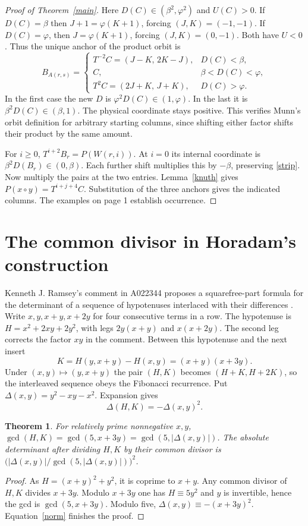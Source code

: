 \documentclass[11pt]{article}
\newtheorem{theorem}{Theorem}
\newcommand{\ph}{\varphi}
\begin{document}
\newpage
\begin{proof}[Proof of Theorem~\ref{main}]
Here $D(C)\in(\beta^2,\ph^2)$ and $U(C)>0$. If $D(C)=\beta$ then
$J+1=\ph(K+1)$, forcing $(J,K)=(-1,-1)$. If $D(C)=\ph$, then
$J=\ph(K+1)$, forcing $(J,K)=(0,-1)$. Both have $U<0$.
Thus the unique anchor of the product orbit is
\[
 B_{A(r,s)}=
 \begin{cases}
 T^{-2} C=(J-K,\,2K-J),&D(C)<\beta,\\
 C,&\beta<D(C)<\ph,\\
 T^2 C=(2J+K,\,J+K),&D(C)>\ph.
 \end{cases}
\]
In the first case the new $D$ is $\ph^2D(C)\in(1,\ph)$. In the last it is
$\beta^2D(C)\in(\beta,1)$. The physical coordinate stays positive.
This verifies Munn's orbit definition for arbitrary starting columns, since shifting
either factor shifts their product by the same amount.

For $i\ge0$, $T^{i+2}B_r=P(W(r,i))$. At $i=0$ its internal coordinate is
$\beta^2D(B_r)\in(0,\beta)$. Each further shift multiplies this by
$-\beta$, preserving \eqref{strip}.
Now multiply the pairs at the two entries. Lemma~\ref{knuth} gives
$P(x\circ y)=T^{i+j+4}C$. Substitution of the three anchors gives the indicated
columns. The examples on page 1 establish occurrence.
\end{proof}

\section{The common divisor in Horadam's construction}
Kenneth J. Ramsey's comment in A022344 proposes a squarefree-part formula for
the determinant of a sequence of hypotenuses interlaced with their differences
\cite{ramsey}. Write $x,y,x+y,x+2y$ for four consecutive terms in a row.
The hypotenuse is $H=x^2+2xy+2y^2$, with legs $2y(x+y)$ and $x(x+2y)$.
The second leg corrects the factor $xy$ in the comment. Between this hypotenuse
and the next insert
\[
     K=H(y,x+y)-H(x,y)=(x+y)(x+3y).
\]
Under $(x,y)\mapsto(y,x+y)$ the pair $(H,K)$ becomes $(H+K,H+2K)$, so the
interleaved sequence obeys the Fibonacci recurrence. Put $\Delta(x,y)=y^2-xy-x^2$.
Expansion gives
\begin{equation}\label{norm}
           \Delta(H,K)=-\Delta(x,y)^2.
\end{equation}

\begin{theorem}\label{gcd}
For relatively prime nonnegative $x,y$, $\gcd(H,K)=\gcd(5,x+3y)=\gcd(5,|\Delta(x,y)|)$.
The absolute determinant after dividing $H,K$ by their common divisor is
$\bigl(|\Delta(x,y)|/\gcd(5,|\Delta(x,y)|)\bigr)^2$.
\end{theorem}
\begin{proof}
As $H=(x+y)^2+y^2$, it is coprime to $x+y$. Any common divisor
of $H,K$ divides $x+3y$. Modulo $x+3y$ one has $H\equiv5y^2$ and $y$ is
invertible, hence the gcd is $\gcd(5,x+3y)$.
Modulo five, $\Delta(x,y)\equiv-(x+3y)^2$. Equation~\eqref{norm} finishes the proof.
\end{proof}
\end{document}
